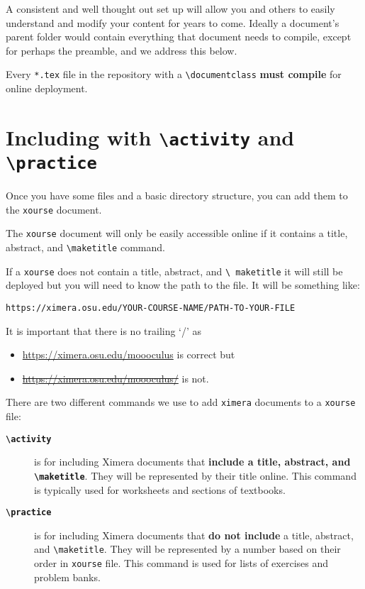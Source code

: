 \documentclass{ximera}
\begin{document}
A consistent and well thought out set up will allow you and others to easily
understand and modify your content for years to come. Ideally a document's parent folder would contain everything that document needs
to compile, except for perhaps the preamble, and we address this below.


\begin{warning}
  Every \verb!*.tex! file in the repository with a \verb!\documentclass!
  \textbf{must compile} for online deployment.
\end{warning}

\section{Including with \texttt{\textbackslash activity} and
  \texttt{\textbackslash practice}}

Once you have some files and a basic directory structure, you can add them to
the \verb!xourse! document.

\begin{warning}
  The \verb!xourse! document will only be easily accessible online if it
  contains a title,
  abstract, and {\tt\textbackslash maketitle} command.

  If a \verb!xourse! does not contain a title, abstract, and {\tt\textbackslash
      maketitle} it will still be deployed but you will need to know the path
  to the
  file. It will be something like:
  \begin{center}
    \tt https://ximera.osu.edu/YOUR-COURSE-NAME/PATH-TO-YOUR-FILE
  \end{center}
  It is important that there is no trailing `/' as
  \begin{itemize}
    \item \url{https://ximera.osu.edu/moooculus} is correct but
    \item \sout{\url{https://ximera.osu.edu/moooculus/}} is not.
  \end{itemize}
\end{warning}

There are two different commands we use to add
\verb!ximera! documents to a \verb!xourse! file:
\begin{description}
  \item[\tt\bfseries\textbackslash activity] is for including Ximera documents
    that
    \textbf{include a title,
      abstract, and \tt\bfseries\textbackslash maketitle}. They will be
    represented by
    their title
    online. This command is typically used for worksheets and sections of
    textbooks.
  \item[\tt\bfseries\textbackslash practice] is for including Ximera documents
    that \textbf{do
      not include} a title, abstract, and \verb!\maketitle!. They will be
    represented by a number  based on their
    order in \verb!xourse! file. This command is used for lists of exercises
    and problem
    banks.
\end{description}
\end{document}
